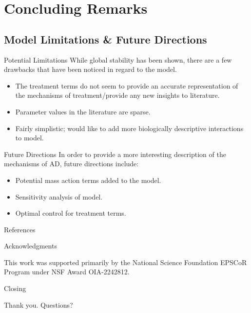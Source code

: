 \documentclass[9pt, dvipsnames,compress,aspectratio=169]{beamer}
\begin{document}
\section{Concluding Remarks}
\subsection{Model Limitations \& Future Directions}
\begin{frame}{Potential Limitations}
    While global stability has been shown, there are a few drawbacks that have been noticed in regard to the model.
    \begin{itemize}
        \item The treatment terms do not seem to provide an accurate representation of the mechanisms of treatment/provide any new insights to literature.
        \item Parameter values in the literature are sparse.
        \item Fairly simplistic; would like to add more biologically descriptive interactions to model.
    \end{itemize}
\end{frame}


\begin{frame}{Future Directions}
    In order to provide a more interesting description of the mechanisms of AD, future directions include:
    \begin{itemize}
        \item Potential mass action terms added to the model.
        \item Sensitivity analysis of model.
        \item Optimal control for treatment terms.
    \end{itemize}
\end{frame}

\begin{frame}{References}
\printbibliography
\end{frame}

\begin{frame}{Acknowledgments}
    \begin{block}{}
        \begin{center}
            This work was supported primarily by the National Science Foundation EPSCoR Program under NSF Award OIA-2242812.
        \end{center}
    \end{block}
\end{frame}

\begin{frame}{Closing}
    \begin{block}{}
       \centering Thank you. Questions?
    \end{block}
\end{frame}
\end{document}
